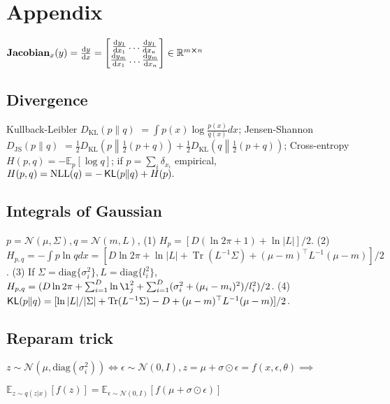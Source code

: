 \section{Appendix}

\makebox[0pt][l]{\smash{\text{\raisebox{-0.7em}{\tiny (numerator layout)}}}}\(\text{\textbf{Jacobian}}_x(y) = \derivative{y}{x} = \begin{bmatrix}
\derivative{y_1}{x_1} \dots \derivative{y_1}{x_n} \\
\makebox[0pt][l]{\smash{\text{\raisebox{1em}{\tiny{\;\;\dots}}}}}\derivative{y_m}{x_1} \dots \makebox[0pt][l]{\smash{\text{\raisebox{1em}{\tiny{\;\;\dots}}}}}\derivative{y_m}{x_n}
\end{bmatrix} \in \mathbb{R}^{m \cross n}\)

\subsection*{Divergence}
Kullback-Leibler $D_{\text{KL}}(p \| q) $ $= \int p(x) \log \frac{p(x)}{q(x)} dx
$; Jensen-Shannon $D_{\text{JS}}(p \| q) $ $= \frac{1}{2} D_{\text{KL}}\left(p \middle\| \frac{1}{2}(p + q)\right) + \frac{1}{2} D_{\text{KL}}\left(q \middle\| \frac{1}{2}(p + q)\right)$; Cross-entropy \(H(p, q)=-\mathbb{E}_{p}[\log q]\); if \(p=\sum_i\delta_{x_i}\) empirical, \(H(p, q) = \mathrm{NLL}(q) = - \operatorname{\mathsf{KL}}(p\|q) + H(p).\)

\subsection*{Integrals of Gaussian}
\(p=\mathcal{N}(\mu, \Sigma),q=\mathcal{N}(m, L)\), (1) \(H_p = [D (\ln 2 \pi+1) + \ln |L|] /2\).
(2) \(H_{p, q} = -\int p \ln q d x = [D \ln 2 \pi + \ln |L|+ \operatorname{Tr}(L^{-1}\Sigma) + (\mu-m)^{\top}L^{-1}(\mu-m)] /2\).
(3) If \(\Sigma = \text{diag}\{\sigma^2_i\},L = \text{diag}\{l^2_i\}\), \(H_{p, q} = (D\ln 2\pi + \sum_{i=1}^{D}\ln \l^2_j +  \sum_{i=1}^{D}(\sigma_i^2 + (\mu_i - m_i)^2) / l_i^2 )/2\).
(4) \(\operatorname{\mathsf{KL}}(p\|q) = [\ln |L|/|\Sigma|+ \operatorname{Tr}(L^{-1}\Sigma) - D + (\mu-m)^{\top}L^{-1}(\mu-m)] /2\).

\subsection*{Reparam trick}
\(z \sim \mathcal{N}(\mu, \text{diag}(\sigma_i^{2})) \Leftrightarrow \epsilon \sim \mathcal{N}(0,I), z=\mu+\sigma \odot \epsilon = f(x, \epsilon, \theta)\)\( \implies\)

\(\mathbb{E}_{z \sim q(z|x)}[f(z)] = \mathbb{E}_{\epsilon \sim \mathcal{N}(0, I)}[f(\mu + \sigma \odot \epsilon)]\)